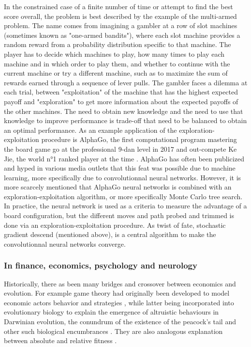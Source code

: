 In the constrained case of a finite number of time or attempt to find the best score overall, the problem is best described by the example of the multi-armed problem. The name comes from imagining a gambler at a row of slot machines (sometimes known as "one-armed bandits"), where each slot machine provides a random reward from a probability distribution specific to that machine. The player has to decide which machines to play, how many times to play each machine and in which order to play them, and whether to continue with the current machine or try a different machine, such as to maximize the sum of rewards earned through a sequence of lever pulls.
The gambler faces a dilemma at each trial, between "exploitation" of the machine that has the highest expected payoff and "exploration" to get more information about the expected payoffs of the other machines. 
The need to obtain new knowledge and the need to use that knowledge to improve performance is trade-off that need to be balanced to obtain an optimal performance.
As an example application of the exploration-exploitation procedure is AlphaGo, the first computational program mastering the board game go at the professional 9-dan level in 2017 and out-compete Ke Jie, the world n°1 ranked player at the time \cite{Silver2017, Silver2018}.
AlphaGo has often been publicized and hyped in various media outlets that this feat was possible due to machine learning, more specifically due to convolutionnal neural networks. However, it is more scarcely mentioned that AlphaGo neural networks is combined with an exploration-exploitation algorithm, or more specifically Monte Carlo tree search. 
In practice, the neural network is used as a criteria to measure the advantage of a board configuration,
but the different moves and path probed and trimmed is done via an exploration-exploitation procedure. 
As twist of fate, stochastic gradient descend (mentioned above), is a central algorithm to make the convolutionnal neural networks converge.

\subsubsection{In finance, economics, psychology and neurology}
Historically, there as been many bridges and crossover between economics and evolution.
For example game theory had originally been developed to model economic actors behavior and strategies \cite{Neumann1947}, while latter being incorporated into evolutionary biology to explain the emergence of altruistic behaviours in Darwinian evolution, the conundrum of the existence of the peacock's tail and other such biological encumbrances \cite{Smith1973, Smith1982}.
They are also analogous explanation between absolute and relative fitness \cite{Masel2016}.

